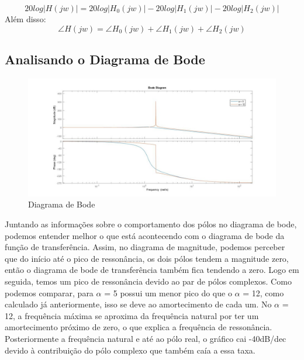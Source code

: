 \documentclass[a4paper,12pt,twoside]{article}
\begin{document}
\begin{equation*}
20log\left | H(jw) \right | = 20log\left | H_{0}(jw) \right | -20log\left | H_{1}(jw) \right | -20log\left | H_{2}(jw) \right |
\end{equation*}
Além disso:
\begin{equation*}
\angle{H(jw)} = \angle{H_{0}(jw)} + \angle{H_{1}(jw)} +\angle{H_{2}(jw)}
\end{equation*}


\subsection{Analisando o Diagrama de Bode}
\begin{figure}[H]
\centering
\includegraphics[scale=0.4]{bode.jpg}
\caption{Diagrama de Bode}
\label{fig:diagrama}
\end{figure}
Juntando as informações sobre o comportamento dos pólos no diagrama de bode, podemos entender melhor o que está acontecendo com o diagrama de bode da função de transferência. \newline
\indent Assim, no diagrama de magnitude, podemos perceber que do início até o pico de ressonância, os dois pólos tendem a magnitude zero, então o diagrama de bode de transferência também fica tendendo a zero. \newline
\indent Logo em seguida, temos um pico de ressonância devido ao par de pólos complexos. Como podemos comparar, para $\alpha$ = 5 possui um menor pico do que o $\alpha$ = 12, como calculado já anteriormente, isso se deve ao amortecimento de cada um. No $\alpha$ = 12, a frequência máxima se aproxima da frequência natural por ter um amortecimento próximo de zero, o que explica a frequência de ressonância.\newline
\indent Posteriormente a frequência natural e até ao pólo real, o gráfico cai -40dB/dec devido à contribuição do pólo complexo que também caía a essa taxa.\newline
\end{document}
